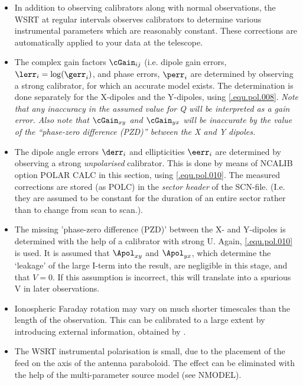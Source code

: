 \begin{itemize}

\item
	In addition to observing calibrators along with normal observations,
the WSRT at regular intervals observes calibrators to determine various
instrumental parameters which are reasonably constant. These corrections are
automatically applied to your data at the telescope.

\item
	The complex gain factors $\cGain_{ij}$ (i.e. dipole gain errors,
$\lerr_i=\log(\gerr_i)$, and phase errors, $\perr_i$ are determined by
observing a strong calibrator, for which an accurate model exists. The
determination is done separately for the X-dipoles and the Y-dipoles, using
\eqref{.equ.pol.008}.  {\em Note that any inaccuracy in the assumed value for Q
will be interpreted as a gain error.  Also note that $\cGain_{xy}$ and
$\cGain_{yx}$ will be inaccurate by the value of the ``phase-zero difference
(PZD)'' between the X and Y dipoles.}

\item
	The dipole angle errors $\derr_i$ and ellipticities $\eerr_i$ are
determined by observing a strong {\em unpolarised} calibrator. This is done by
means of NCALIB option POLAR CALC in this section, using \eqref{.equ.pol.010}.
The measured corrections are stored (as POLC) in the {\em sector header} of the
SCN-file. (I.e. they are assumed to be constant for the duration of an entire
sector rather than to change from scan to scan.).

\item
	The missing 'phase-zero difference (PZD)' between the X- and Y-dipoles
is determined with the help of a calibrator with strong U. Again,
\eqref{.equ.pol.010} is used.  It is assumed that $\Apol_{xy}$ and
$\Apol_{yx}$, which determine the `leakage' of the large I-term into the
result, are negligible in this stage, and that $V=0$.  If this assumption is
incorrect, this will translate into a spurious V in later observations.

\item
	Ionospheric Faraday rotation may vary on much shorter timescales than
the length of the observation.  This can be calibrated to a large extent by
introducing external information, obtained by
.

\item
	The WSRT instrumental polarisation is small, due to the placement of
the feed on the axis of the antenna paraboloid.  The effect can be eliminated
with the help of the multi-parameter \NEWSTAR source model (see NMODEL).

\end{itemize}

